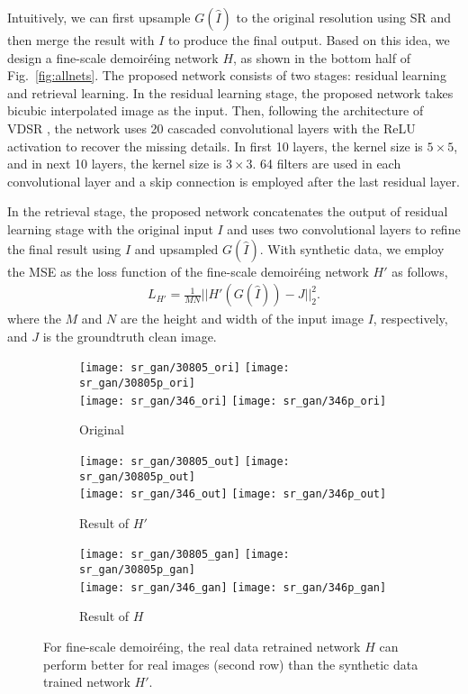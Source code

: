 \documentclass[10pt,twocolumn,letterpaper]{article}
\begin{document}
Intuitively, we can first upsample $G(\hat{I})$ to the original
resolution using SR and then merge the result with $I$ to produce the
final output.  Based on this idea, we design a fine-scale demoir\'eing
network $H$, as shown in the bottom half of Fig.~\ref{fig:allnets}.
The proposed network consists of two stages: residual learning and
retrieval learning.  In the residual learning stage, the proposed
network takes bicubic interpolated image as the input.  Then,
following the architecture of VDSR \cite{kim2016accurate}, the network
uses 20 cascaded convolutional layers with the ReLU activation to
recover the missing details.  In first 10 layers, the kernel size is
$5 \times 5$, and in next 10 layers, the kernel size is $3 \times 3$.
64 filters are used in each convolutional layer and a skip connection
is employed after the last residual layer.

In the retrieval stage, the proposed network concatenates the output
of residual learning stage with the original input $I$ and uses two
convolutional layers to refine the final result using $I$ and
upsampled $G(\hat{I})$.  With synthetic data, we employ the MSE as the
loss function of the fine-scale demoir\'eing network $H'$ as follows,
\begin{align}
  L_{H'} = \frac{1}{MN}||H'(G(\hat{I})) - J||_2^2.
\end{align}
where the $M$ and $N$ are the height and width of the input image $I$,
respectively, and $J$ is the groundtruth clean image.

\begin{figure}
  \centering
  \begin{subfigure}{0.32\linewidth}
    \texttt{[image: sr\_gan/30805\_ori]}
    \texttt{[image: sr\_gan/30805p\_ori]}
    \\[1ex]
    \texttt{[image: sr\_gan/346\_ori]}
    \texttt{[image: sr\_gan/346p\_ori]}
    \caption{Original}
  \end{subfigure}
  \begin{subfigure}{0.32\linewidth}
    \texttt{[image: sr\_gan/30805\_out]}
    \texttt{[image: sr\_gan/30805p\_out]}
    \\[1ex]
    \texttt{[image: sr\_gan/346\_out]}
    \texttt{[image: sr\_gan/346p\_out]}
    \caption{Result of $H'$}
  \end{subfigure}
  \begin{subfigure}{0.32\linewidth}
    \texttt{[image: sr\_gan/30805\_gan]}
    \texttt{[image: sr\_gan/30805p\_gan]}
    \\[1ex]
    \texttt{[image: sr\_gan/346\_gan]}
    \texttt{[image: sr\_gan/346p\_gan]}
    \caption{Result of $H$}
  \end{subfigure}

  \caption{For fine-scale demoir\'eing, the real data retrained
    network $H$ can perform better for real images (second row) than
    the synthetic data trained network $H'$.}

  \label{fig:exp_srgan}
\end{figure}
\end{document}
